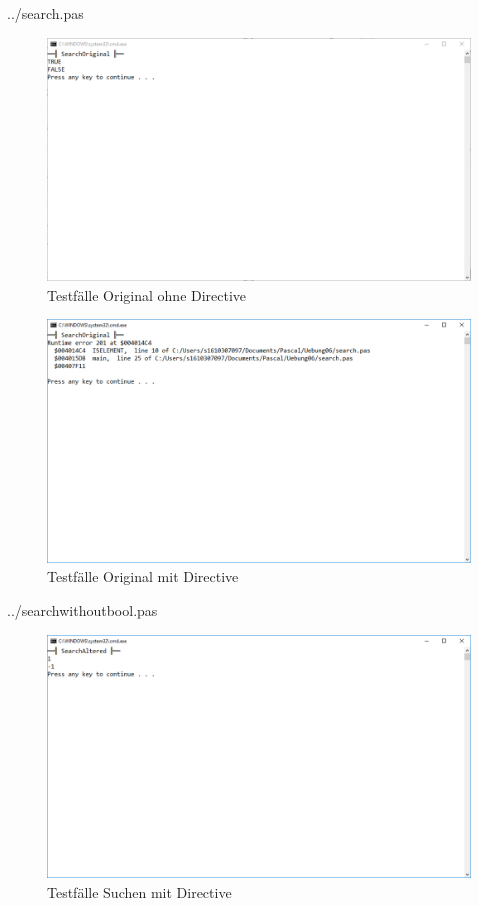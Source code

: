  {../search.pas}
\begin{figure}[H]
	\centering
	\includegraphics[scale=0.5]{./pictures/Original withoutdirective.png}
	\caption{Testfälle Original ohne Directive}
	\label{fig: Original withoutdirective}
\end{figure}

\begin{figure}[H]
	\centering
	\includegraphics[scale=0.5]{./pictures/Original withdirective.png}
	\caption{Testfälle Original mit Directive}
	\label{fig: Original withdirective}
\end{figure}

 {../searchwithoutbool.pas}
\begin{figure}[H]
	\centering
	\includegraphics[scale=0.5]{./pictures/Altered with directive.png}
	\caption{Testfälle Suchen mit Directive}
	\label{fig: Search without Bool}
\end{figure}

